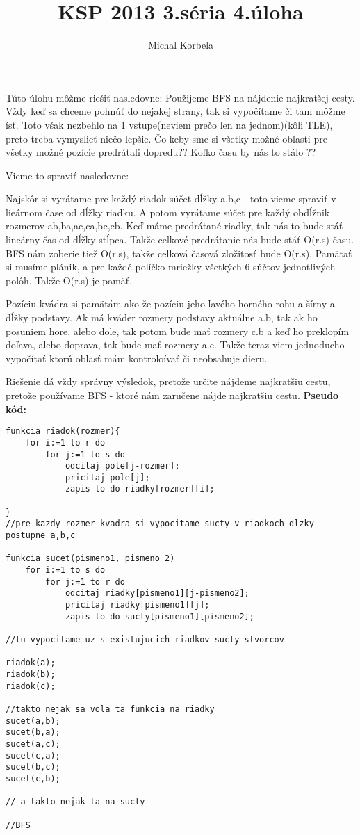 \documentclass[a4paper,11pt]{article}
\title{KSP 2013 3.séria 4.úloha}
\author{Michal Korbela}
\begin{document}
Túto úlohu môžme riešiť nasledovne:
 Použijeme BFS na nájdenie najkratšej cesty. Vždy keď sa chceme pohnúť do nejakej strany, tak si vypočítame či tam môžme ísť. Toto však nezbehlo na 1 vstupe(neviem prečo len na jednom)(kôli TLE), preto treba vymyslieť niečo lepšie.
 Čo keby sme si všetky možné oblasti pre všetky možné pozície predrátali dopredu?? Koľko času by nás to stálo ?? \newline
 \newline
 
 Vieme to spraviť nasledovne:
 
 Najskôr si vyrátame pre každý riadok súčet dĺžky a,b,c - toto vieme spraviť v lieárnom čase od dĺžky riadku. A potom vyrátame súčet pre každý obdĺžnik rozmerov ab,ba,ac,ca,bc,cb. Keď máme predrátané riadky, tak nás to bude stáť lineárny čas od dĺžky stĺpca. Takže celkové predrátanie nás bude stáť O(r.s) času.
 BFS nám zoberie tiež O(r.s), takže celková časová zložitosť bude O(r.s). Pamätať si musíme plánik, a pre každé políčko mriežky všetkých 6 súčtov jednotlivých polôh. Takže O(r.s) je pamäť.
 
Pozíciu kvádra si pamätám ako že pozíciu jeho ľavého horného rohu a šírny a dĺžky podstavy. Ak má kváder rozmery podstavy aktuálne a.b, tak ak ho posuniem hore, alebo dole, tak potom bude mať rozmery c.b a keď ho preklopím doľava, alebo doprava, tak bude mať rozmery a.c. Takže teraz viem jednoducho vypočítať ktorú oblasť mám kontroloívať či neobsahuje dieru.

Riešenie dá vždy správny výsledok, pretože určite nájdeme najkratšiu cestu, pretože používame BFS - ktoré nám zaručene nájde najkratšiu cestu.
\newline
\newline
\textbf{Pseudo kód:}\newline

\begin{lstlisting}
funkcia riadok(rozmer){
	for i:=1 to r do
		for j:=1 to s do
			odcitaj pole[j-rozmer];
			pricitaj pole[j];
			zapis to do riadky[rozmer][i];

}
//pre kazdy rozmer kvadra si vypocitame sucty v riadkoch dlzky postupne a,b,c

funkcia sucet(pismeno1, pismeno 2)
	for i:=1 to s do
		for j:=1 to r do
			odcitaj riadky[pismeno1][j-pismeno2];
			pricitaj riadky[pismeno1][j];
			zapis to do sucty[pismeno1][pismeno2];

//tu vypocitame uz s existujucich riadkov sucty stvorcov

riadok(a);
riadok(b);
riadok(c);

//takto nejak sa vola ta funkcia na riadky
sucet(a,b);
sucet(b,a);
sucet(a,c);
sucet(c,a);
sucet(b,c);
sucet(c,b);

// a takto nejak ta na sucty

//BFS

\end{lstlisting}
\end{document}
